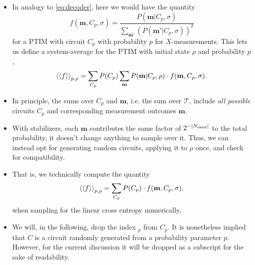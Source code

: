 \begin{itemize}
  \item In analogy to \cref{eq:decoder}, here we would have the quantity
    \[
      f(\mathbf{m}, C_p, \sigma) = \frac{P(\mathbf{m} |
     C_p,\sigma)}{\sum_{\mathbf{m'}}\left(P(\mathbf{m}'|C_p,\sigma)\right)^2}
    \]
    for a PTIM with circuit $C_p$ with probability $p$ for $X$-measurements. This
    lets us define a system-average for the PTIM with initial state $\rho$ and
    probability $p$,
    \begin{align}
      \expval{\expval{f}}_{p,\rho} = \sum_{C_p} P(C_p) \sum_\mathbf{m}
      P(\mathbf{m} |C_p,\rho)\cdot f(\mathbf{m},C_p, \sigma)
    .\end{align}
  \item In principle, the sums over $C_p$ and $\mathbf{m}$, i.e. the sum over
    $\mathcal{T}$, include \emph{all possible} circuits $C_p$ and
    corresponding measurement outcomes $\mathbf{m}$.
  \item With stabilizers, each $\mathbf{m}$ contributes the same factor of
    $2^{-\abs{N_\mathrm{rand}}}$ to the total probability, it doesn't change
    anything to sample over it. Thus, we can instead opt for generating random
    circuits, applying it to $\rho$ once, and check for compatibility. 
  \item That is, we technically compute the quantity
    \begin{align}\label{eq:sample-f-C}
      \expval{\expval{f}}_{p,\rho} = \sum_{C_p} P(C_p)
      \cdot f(\mathbf{m},C_p, \sigma)
    ,\end{align}
    when sampling for the linear cross entropy numerically.
  \item We will, in the following, drop the index $_p$ from $C_p$. It is
    nonetheless implied that $C$ is a circuit randomly generated from a probability
    parameter $p$. However, for the current discussion it will be dropped as a
    subscript for the sake of readability.
\end{itemize}

